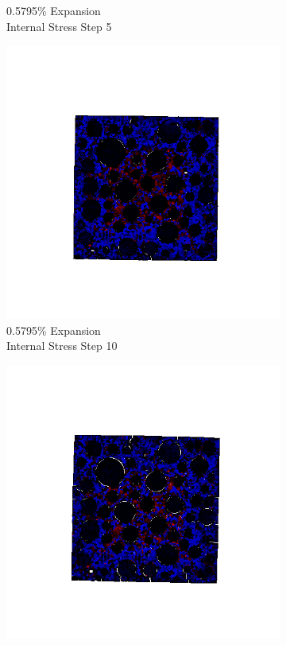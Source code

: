 \begin{figure}[h!]
\begin{subfigure}{.25\textwidth}
      \caption{0.5795\% Expansion\\Internal Stress Step 5}
    \end{subfigure}%
    \begin{subfigure}{.25\textwidth}
      \centering
      \includegraphics[width=1.0\linewidth]{Files/exp_3D/DEF/A30X0C_3_s10.png}
      \caption{0.5795\% Expansion\\Internal Stress Step 10}
    \end{subfigure}%
    \begin{subfigure}{.25\textwidth}
      \centering
      \includegraphics[width=1.0\linewidth]{Files/exp_3D/DEF/A30X0C_3_s15.png}

\end{subfigure}
\end{figure}
